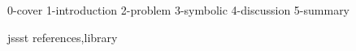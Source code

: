 \documentclass[T]{compsoft}
\begin{document}
 {0-cover}
 {1-introduction}
 {2-problem}
 {3-symbolic}
 {4-discussion}
 {5-summary}

 {jssst}
 {references,library}
\end{document}
